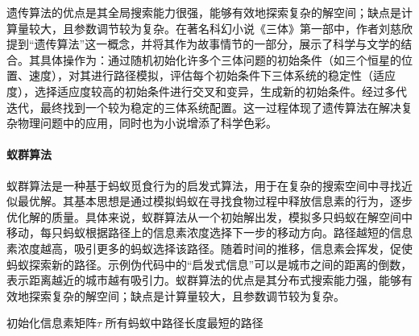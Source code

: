 遗传算法的优点是其全局搜索能力很强，能够有效地探索复杂的解空间；缺点是计算量较大，且参数调节较为复杂。在著名科幻小说《三体》第一部中，作者刘慈欣提到“遗传算法”这一概念，并将其作为故事情节的一部分，展示了科学与文学的结合。其具体操作为：通过随机初始化许多个三体问题的初始条件（如三个恒星的位置、速度），对其进行路径模拟，评估每个初始条件下三体系统的稳定性（适应度），选择适应度较高的初始条件进行交叉和变异，生成新的初始条件。经过多代迭代，最终找到一个较为稳定的三体系统配置。这一过程体现了遗传算法在解决复杂物理问题中的应用，同时也为小说增添了科学色彩。

\paragraph{蚁群算法} 蚁群算法是一种基于蚂蚁觅食行为的启发式算法，用于在复杂的搜索空间中寻找近似最优解。其基本思想是通过模拟蚂蚁在寻找食物过程中释放信息素的行为，逐步优化解的质量。具体来说，蚁群算法从一个初始解出发，模拟多只蚂蚁在解空间中移动，每只蚂蚁根据路径上的信息素浓度选择下一步的移动方向。路径越短的信息素浓度越高，吸引更多的蚂蚁选择该路径。随着时间的推移，信息素会挥发，促使蚂蚁探索新的路径。示例伪代码中的“启发式信息”可以是城市之间的距离的倒数，表示距离越近的城市越有吸引力。蚁群算法的优点是其分布式搜索能力强，能够有效地探索复杂的解空间；缺点是计算量较大，且参数调节较为复杂。
\begin{algorithm}[htbp]
    \caption{蚁群算法解决TSP问题的伪代码}\label{alg:ant-colony}
    初始化信息素矩阵$\tau$\;
    \Return 所有蚂蚁中路径长度最短的路径\;
\end{algorithm}

